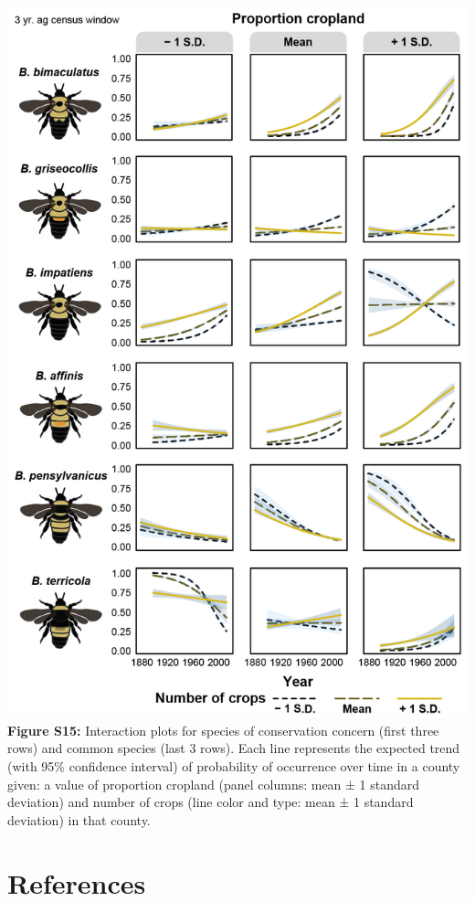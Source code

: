 \documentclass[11pt,]{article}
\begin{document}
\includegraphics[width=1\textwidth,height=\textheight]{../ms_figs/fig_s15.png}
\textbf{Figure S15:} Interaction plots for species of conservation
concern (first three rows) and common species (last 3 rows). Each line
represents the expected trend (with 95\% confidence interval) of
probability of occurrence over time in a county given: a value of
proportion cropland (panel columns: mean ± 1 standard deviation) and
number of crops (line color and type: mean ± 1 standard deviation) in
that county. \clearpage

\hypertarget{references}{%
\section*{References}\label{references}}
\end{document}
